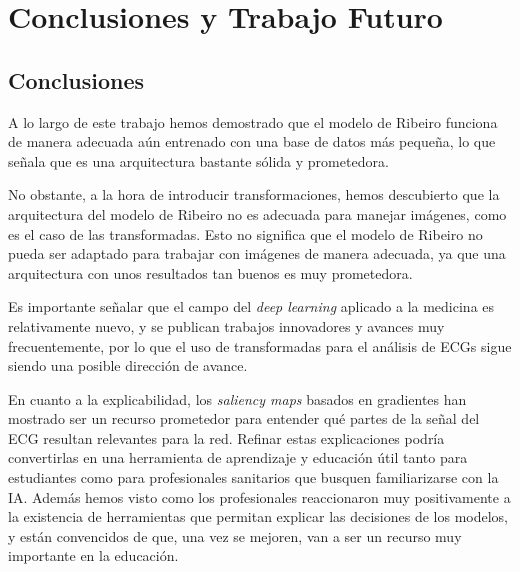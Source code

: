 \chapter{Conclusiones y Trabajo Futuro}
\label{cap:conclusiones}

\section{Conclusiones}
A lo largo de este trabajo hemos demostrado que el modelo de Ribeiro funciona de manera adecuada aún entrenado con una base de datos más pequeña, lo que señala que es una arquitectura bastante sólida y prometedora.

No obstante, a la hora de introducir transformaciones, hemos descubierto que la arquitectura del modelo de Ribeiro no es adecuada para manejar imágenes, como es el caso de las transformadas. Esto no significa que el modelo de Ribeiro no pueda ser adaptado para trabajar con imágenes de manera adecuada, ya que una arquitectura con unos resultados tan buenos es muy prometedora.

Es importante señalar que el campo del \emph{deep learning} aplicado a la medicina es relativamente nuevo, y se publican trabajos innovadores y avances muy frecuentemente, por lo que el uso de transformadas para el análisis de ECGs sigue siendo una posible dirección de avance.

En cuanto a la explicabilidad, los \emph{saliency maps} basados en gradientes han mostrado ser un recurso prometedor para entender qué partes de la señal del ECG resultan relevantes para la red. Refinar estas explicaciones podría convertirlas en una herramienta de aprendizaje y educación útil tanto para estudiantes como para profesionales sanitarios que busquen familiarizarse con la IA. Además hemos visto como los profesionales reaccionaron muy positivamente a la existencia de herramientas que permitan explicar las decisiones de los modelos, y están convencidos de que, una vez se mejoren, van a ser un recurso muy importante en la educación.

